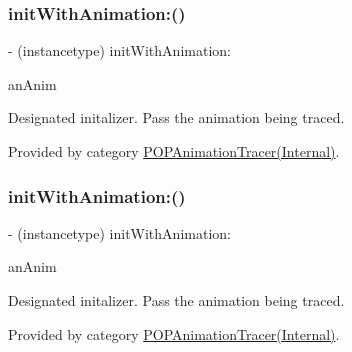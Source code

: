 \subsubsection{\texorpdfstring{init\+With\+Animation\+:()}{initWithAnimation:()}\hspace{0.1cm}{\footnotesize\ttfamily [1/2]}}
{\footnotesize\ttfamily -\/ (instancetype) init\+With\+Animation\+: \begin{DoxyParamCaption}\item[{(\mbox{\hyperlink{interface_p_o_p_animation}{P\+O\+P\+Animation}} $\ast$)}]{an\+Anim }\end{DoxyParamCaption}}

Designated initalizer. Pass the animation being traced. 

Provided by category \mbox{\hyperlink{category_p_o_p_animation_tracer_07_internal_08_a172bb65bdc4887fc5bfe4bcd38e5a5e8}{P\+O\+P\+Animation\+Tracer(\+Internal)}}.

\mbox{\label{interface_p_o_p_animation_tracer_a172bb65bdc4887fc5bfe4bcd38e5a5e8}} 
\subsubsection{\texorpdfstring{init\+With\+Animation\+:()}{initWithAnimation:()}\hspace{0.1cm}{\footnotesize\ttfamily [2/2]}}
{\footnotesize\ttfamily -\/ (instancetype) init\+With\+Animation\+: \begin{DoxyParamCaption}\item[{(\mbox{\hyperlink{interface_p_o_p_animation}{P\+O\+P\+Animation}} $\ast$)}]{an\+Anim }\end{DoxyParamCaption}}

Designated initalizer. Pass the animation being traced. 

Provided by category \mbox{\hyperlink{category_p_o_p_animation_tracer_07_internal_08_a172bb65bdc4887fc5bfe4bcd38e5a5e8}{P\+O\+P\+Animation\+Tracer(\+Internal)}}.

\mbox{\label{interface_p_o_p_animation_tracer_a219ed8a35e2d3fa997e5688386572f15}} 
